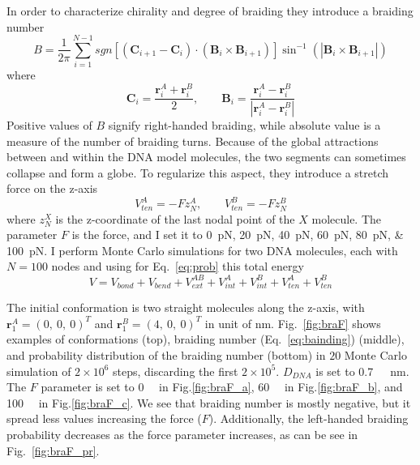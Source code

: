 \documentclass[a4paper,10pt]{article}
\begin{document}
In order to characterize chirality and degree of braiding they introduce a braiding number
\begin{equation}\label{eq:braiding}
B=\dfrac{1}{2\pi}\sum_{i=1}^{N-1}sgn\left [\left (\textbf{C}_{i+1}-\textbf{C}_{i}\right )\cdot\left (\textbf{B}_{i}\times\textbf{B}_{i+1}\right )\right ]\sin^{-1}\left (\left |\textbf{B}_{i}\times\textbf{B}_{i+1}\right |\right )
\end{equation}
where
\begin{equation}
\textbf{C}_{i}=\dfrac{\textbf{r}_{i}^{A}+\textbf{r}_{i}^{B}}{2},\qquad \textbf{B}_{i}=\dfrac{\textbf{r}_{i}^{A}-\textbf{r}_{i}^{B}}{\left |\textbf{r}_{i}^{A}-\textbf{r}_{i}^{B}\right |}
\end{equation}
Positive values of $B$ signify right-handed braiding, while absolute value is a measure of the number of braiding turns.
Because of the global attractions between and within the DNA model molecules, the two segments can sometimes collapse and form a globe.
To regularize this aspect, they introduce a stretch force on the z-axis
\begin{equation}\label{eq:ten}
V_{ten}^{A}=-Fz_{N}^{A},\qquad V_{ten}^{B}=-Fz_{N}^{B}
\end{equation}
where $z_{N}^{X}$ is the z-coordinate of the last nodal point of the $X$ molecule.
The parameter $F$ is the force, and I set it to \SIlist{0; 20; 40; 60; 80; 100}{\pico\newton}.
I perform Monte Carlo simulations for two DNA molecules, each with $N=100$ nodes and using for Eq.~\ref{eq:prob} this total energy
\begin{equation}\label{eq:bra_energy}
V=V_{bond}+V_{bend}+V_{ext}^{AB}+V_{int}^{A}+V_{int}^{B}+V_{ten}^{A}+V_{ten}^{B}
\end{equation}

The initial conformation is two straight molecules along the z-axis, with $\textbf{r}_{1}^{A}=\left (0,\ 0,\ 0\right )^T$ and $\textbf{r}_{1}^{B}=\left (4,\ 0,\ 0\right )^T$ in unit of \si{\nm}.
Fig.~\ref{fig:braF} shows examples of conformations (top), braiding number (Eq.~\ref{eq:bainding}) (middle), and probability distribution of the braiding number (bottom) in $20$ Monte Carlo simulation of $2\times 10^6$ steps, discarding the first $2\times 10^5$.
$D_{DNA}$ is set to \SI{0.7}{\pico\neuton\nano\meter}.
The $F$ parameter is set to \SI{0}{\pico\neuton} in Fig.\ref{fig:braF_a}, \SI{60}{\pico\neuton} in Fig.\ref{fig:braF_b}, and \SI{100}{\pico\neuton} in Fig.\ref{fig:braF_c}.
We see that braiding number is mostly negative, but it spread less values increasing the force ($F$).
Additionally, the left-handed braiding probability decreases as the force parameter increases, as can be see in Fig.~\ref{fig:braF_pr}.
\end{document}
